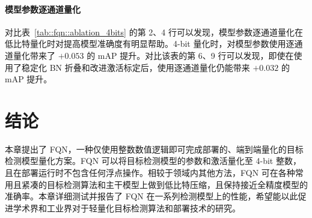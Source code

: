 \paragraph{模型参数逐通道量化}
对比表~\ref{tab::fqn::ablation_4bits} 的第 2、4 行可以发现，模型参数逐通道量化在低比特量化时对提高模型准确度有明显帮助。4-bit 量化时，对模型参数使用逐通道量化带来了 $+0.053$ 的 mAP 提升。对比该表的第 6、9 行可以发现，即使在使用了稳定化 BN 折叠和改进激活标定后，使用逐通道量化仍能带来 $+0.032$ 的 mAP 提升。
\section{结论}
本章提出了 FQN，一种仅使用整数数值逻辑即可完成部署的、端到端量化的目标检测模型量化方案。FQN 可以将目标检测模型的参数和激活量化至 4-bit 整数，且在部署运行时不包含任何浮点操作。相较于领域内其他方法，FQN 可在各种常用且紧凑的目标检测算法和主干模型上做到低比特压缩，且保持接近全精度模型的准确率。本章详细测试并报告了 FQN 在一系列检测模型上的性能，希望能以此促进学术界和工业界对于轻量化目标检测算法和部署技术的研究。
